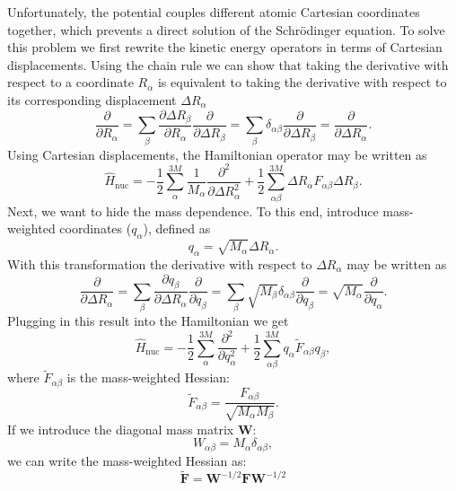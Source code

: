 \documentclass[../Main/chem532-notes.tex]{subfiles}
\begin{document}
Unfortunately, the potential couples different atomic Cartesian coordinates together, which prevents a direct solution of the Schr\"{o}dinger equation.
To solve this problem we first rewrite the kinetic energy operators in terms of Cartesian displacements. Using the chain rule we can show that taking the derivative with respect to a coordinate $R_\alpha$ is equivalent to taking the derivative with respect to its corresponding displacement $ \Delta R_\alpha$
\begin{equation}
\frac{\partial}{\partial R_\alpha}
= \sum_\beta \frac{\partial \Delta R_\beta}{\partial R_\alpha} \frac{\partial }{\partial \Delta R_\beta}
= \sum_\beta \delta_{\alpha\beta} \frac{\partial }{\partial \Delta R_\beta}
= \frac{\partial }{\partial \Delta R_\alpha}.
\end{equation}
Using Cartesian displacements, the Hamiltonian operator may be written as
\begin{equation}
\hat{H}_\mathrm{nuc} = -\frac{1}{2} \sum_\alpha^{3M} \frac{1}{M_\alpha} \frac{\partial^2}{\partial \Delta R_\alpha^2}
+ \frac{1}{2} \sum_{\alpha\beta}^{3M} \Delta R_\alpha F_{\alpha\beta} \Delta R_\beta.
\end{equation}
Next, we want to hide the mass dependence. To this end, introduce mass-weighted  coordinates ($q_\alpha$), defined as
\begin{equation}
q_\alpha = \sqrt{M_\alpha} \Delta R_\alpha.
\end{equation}
With this transformation the derivative with respect to $\Delta R_\alpha$ may be written as
\begin{equation}
\frac{\partial }{\partial \Delta R_\alpha}
= \sum_\beta \frac{\partial q_\beta}{\partial \Delta R_\alpha} \frac{\partial}{\partial q_\beta}
= \sum_\beta \sqrt{M_\beta} \delta_{\alpha\beta} \frac{\partial}{\partial q_\beta} = \sqrt{M_\alpha} \frac{\partial}{\partial q_\alpha}.
\end{equation}
Plugging in this result into the Hamiltonian we get
\begin{equation}
\hat{H}_\mathrm{nuc} = -\frac{1}{2} \sum_\alpha^{3M} \frac{\partial^2}{\partial q_\alpha^2}
+ \frac{1}{2} \sum_{\alpha\beta}^{3M} q_\alpha \tilde{F}_{\alpha\beta} q_\beta,
\end{equation}
where $\tilde{F}_{\alpha\beta}$ is the mass-weighted Hessian:
\begin{equation}
\tilde{F}_{\alpha\beta} = \frac{F_{\alpha\beta}}{\sqrt{M_\alpha M_\beta}}.
\end{equation}
If we introduce the diagonal mass matrix $\mathbf{W}$:
\begin{equation}
W_{\alpha\beta} = M_\alpha \delta_{\alpha\beta},
\end{equation}
we can write the mass-weighted Hessian as:
\begin{equation}
\tilde{\mathbf{F}} = \mathbf{W}^{-1/2} \mathbf{F} \mathbf{W}^{-1/2}
\end{equation}
\end{document}
